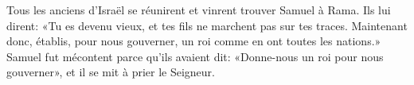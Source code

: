 Tous les anciens d’Israël se réunirent et vinrent trouver Samuel à Rama.
Ils lui dirent: «Tu es devenu vieux, et tes fils ne marchent pas sur tes traces.
Maintenant donc, établis, pour nous gouverner,
	un roi comme en ont toutes les nations.»
Samuel fut mécontent parce qu’ils avaient dit:
	«Donne-nous un roi pour nous gouverner»,
	et il se mit à prier le Seigneur.
